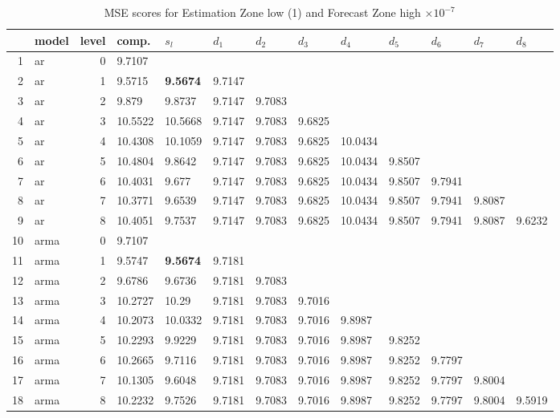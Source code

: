 \documentclass[10pt,a4paper]{article}
\begin{document}
\begin{table}[ht]
\centering
\caption{MSE scores for Estimation Zone low (1) and Forecast Zone high $ \times 10^{-7}$} 
\begin{tabular}{rlrllllllllll}
  \hline
 & model & level & comp. & $s_l$ & $d_1$ & $d_2$ & $d_3$ & $d_4$ & $d_5$ & $d_6$ & $d_7$ & $d_8$ \\ 
  \hline
1 & ar &     0 & 9.7107 &  &  &  &  &  &  &  &  &  \\ 
  2 & ar &     1 & 9.5715 & \textbf{9.5674} & 9.7147 &  &  &  &  &  &  &  \\ 
  3 & ar &     2 & 9.879 & 9.8737 & 9.7147 & 9.7083 &  &  &  &  &  &  \\ 
  4 & ar &     3 & 10.5522 & 10.5668 & 9.7147 & 9.7083 & 9.6825 &  &  &  &  &  \\ 
  5 & ar &     4 & 10.4308 & 10.1059 & 9.7147 & 9.7083 & 9.6825 & 10.0434 &  &  &  &  \\ 
  6 & ar &     5 & 10.4804 & 9.8642 & 9.7147 & 9.7083 & 9.6825 & 10.0434 & 9.8507 &  &  &  \\ 
  7 & ar &     6 & 10.4031 & 9.677 & 9.7147 & 9.7083 & 9.6825 & 10.0434 & 9.8507 & 9.7941 &  &  \\ 
  8 & ar &     7 & 10.3771 & 9.6539 & 9.7147 & 9.7083 & 9.6825 & 10.0434 & 9.8507 & 9.7941 & 9.8087 &  \\ 
  9 & ar &     8 & 10.4051 & 9.7537 & 9.7147 & 9.7083 & 9.6825 & 10.0434 & 9.8507 & 9.7941 & 9.8087 & 9.6232 \\ 
   \hline
10 & arma &     0 & 9.7107 &  &  &  &  &  &  &  &  &  \\ 
  11 & arma &     1 & 9.5747 & \textbf{9.5674} & 9.7181 &  &  &  &  &  &  &  \\ 
  12 & arma &     2 & 9.6786 & 9.6736 & 9.7181 & 9.7083 &  &  &  &  &  &  \\ 
  13 & arma &     3 & 10.2727 & 10.29 & 9.7181 & 9.7083 & 9.7016 &  &  &  &  &  \\ 
  14 & arma &     4 & 10.2073 & 10.0332 & 9.7181 & 9.7083 & 9.7016 & 9.8987 &  &  &  &  \\ 
  15 & arma &     5 & 10.2293 & 9.9229 & 9.7181 & 9.7083 & 9.7016 & 9.8987 & 9.8252 &  &  &  \\ 
  16 & arma &     6 & 10.2665 & 9.7116 & 9.7181 & 9.7083 & 9.7016 & 9.8987 & 9.8252 & 9.7797 &  &  \\ 
  17 & arma &     7 & 10.1305 & 9.6048 & 9.7181 & 9.7083 & 9.7016 & 9.8987 & 9.8252 & 9.7797 & 9.8004 &  \\ 
  18 & arma &     8 & 10.2232 & 9.7526 & 9.7181 & 9.7083 & 9.7016 & 9.8987 & 9.8252 & 9.7797 & 9.8004 & 9.5919 \\ 

\end{tabular}
\end{table}
\end{document}
